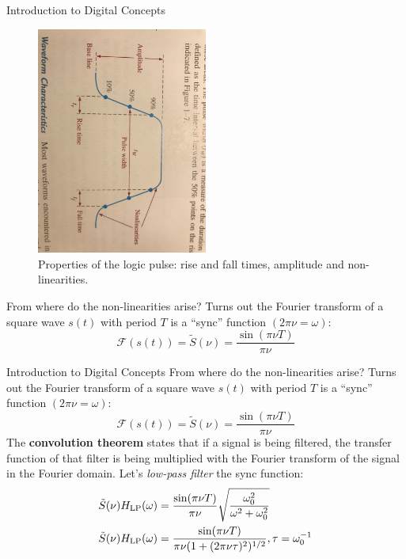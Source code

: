 \documentclass{beamer}
\begin{document}
\begin{frame}{Introduction to Digital Concepts}
\begin{figure}
\centering
\includegraphics[width=0.5\textwidth,trim=1cm 7cm 0cm 9cm,clip=true]{figures/pulse.jpg}
\caption{\label{fig:pulse} Properties of the logic pulse: rise and fall times, amplitude and non-linearities.}
\end{figure}
From where do the non-linearities arise? Turns out the Fourier transform of a square wave $s(t)$ with period $T$ is a ``sync'' function $(2\pi\nu = \omega)$:
\begin{equation}
\mathcal{F}(s(t)) = \tilde{S}(\nu) = \frac{\sin(\pi\nu T)}{\pi\nu}
\end{equation}
\end{frame}

\begin{frame}{Introduction to Digital Concepts}
From where do the non-linearities arise? Turns out the Fourier transform of a square wave $s(t)$ with period $T$ is a ``sync'' function $(2\pi\nu = \omega)$:
\begin{equation}
\mathcal{F}(s(t)) = \tilde{S}(\nu) = \frac{\sin(\pi\nu T)}{\pi\nu}
\end{equation}
The \textbf{convolution theorem} states that if a signal is being filtered, the transfer function of that filter is being multiplied with the Fourier transform of the signal in the Fourier domain.  Let's \textit{low-pass filter} the sync function:
\begin{align}
\tilde{S}(\nu)H_{\rm LP}(\omega) &= \frac{\sin(\pi\nu T)}{\pi\nu}\sqrt{\frac{\omega_0^2}{\omega^2+\omega_0^2}} \\
\tilde{S}(\nu)H_{\rm LP}(\omega) &= \frac{\sin(\pi\nu T)}{\pi\nu(1+(2\pi\nu\tau)^2)^{1/2}}, \tau = \omega_{\rm 0}^{-1}
\end{align}
\end{frame}
\end{document}
